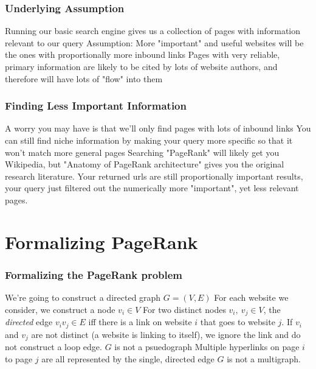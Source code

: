 \documentclass{beamer}
\begin{document}
\begin{frame}[t]
\frametitle{Underlying Assumption}    
\begin{outline}
    \1 Running our basic search engine gives us a collection of pages with information relevant to our query
    \1 Assumption: More "important" and useful websites will be the ones with proportionally more inbound links
    \1 Pages with very reliable, primary information are likely to be cited by lots of website authors, and therefore will have lots of "flow" into them
\end{outline}
\end{frame}

\begin{frame}[t]
\frametitle{Finding Less Important Information}
\begin{outline}
    \1 A worry you may have is that we'll only find pages with lots of inbound links
    \1 You can still find niche information by making your query more specific so that it won't match more general pages
    \1 Searching "PageRank" will likely get you Wikipedia, but "Anatomy of PageRank architecture" gives you the original research literature. 
    \1 Your returned urls are still proportionally important results, your query just filtered out the numerically more "important", yet less relevant pages.
\end{outline}
\end{frame}

\section{Formalizing PageRank}
\begin{frame}[t]
\frametitle{Formalizing the PageRank problem}
\begin{outline}
    \1 We're going to construct a directed graph $G = (V, E)$
    \1 For each website we consider, we construct a node $v_i \in V$
    \1 For two distinct nodes $v_i,\ v_j \in V$, the \emph{directed} edge $v_iv_j \in E$ iff there is a link on website $i$ that goes to website $j$.
    \1 If $v_i$ and $v_j$ are not distinct (a website is linking to itself), we ignore the link and do not construct a loop edge.
        \2 $G$ is not a psuedograph
    \1 Multiple hyperlinks on page $i$ to page $j$ are all represented by the single, directed edge 
        \2 $G$ is not a multigraph.
\end{outline}
\end{frame}
\end{document}
